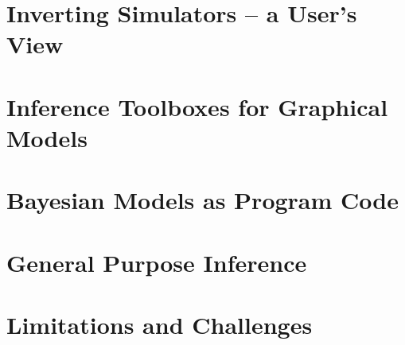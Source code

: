 \section{Inverting Simulators -- a User's View}
\label{sec:probprog:inv}

\section{Inference Toolboxes for Graphical Models}
\label{sec:probprog:tool}

\section{Bayesian Models as Program Code}
\label{sec:probprog:models}

\section{General Purpose Inference}
\label{sec:probprog:inf}

\section{Limitations and Challenges}
\label{sec:probprog:limit}
